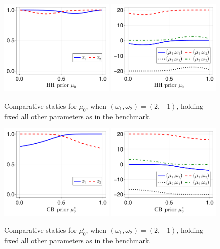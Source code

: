 \documentclass[12pt,a4paper]{article}
\begin{document}
\begin{figure}[H]
\centering
\includegraphics[width=0.49\textwidth]{figures/V8/γ_10/fig_optimal_π_across_μ_0_ω_1_2_ω_2_-1_δ_0.5_.pdf}
\includegraphics[width=0.49\textwidth]{figures/V8/γ_10/fig_posterior_across_μ_0_ω_1_2_ω_2_-1_δ_0.5_.pdf}
\caption{Comparative statics for $\mu_0$, when $(\omega_1,\omega_2)=(2,-1)$, holding fixed all other parameters as in the benchmark.}
\label{FigureA7}
\end{figure}

\begin{figure}[H]
\centering
\includegraphics[width=0.49\textwidth]{figures/V8/γ_10/fig_optimal_π_across_μ_0_c_ω_1_2_ω_2_-1_δ_0.5_.pdf}
\includegraphics[width=0.49\textwidth]{figures/V8/γ_10/fig_posterior_across_μ_0_c_ω_1_2_ω_2_-1_δ_0.5_.pdf}
\caption{Comparative statics for $\mu_0^c$, when $(\omega_1,\omega_2)=(2,-1)$, holding fixed all other parameters as in the benchmark.}
\label{FigureA8}
\end{figure}
\end{document}
